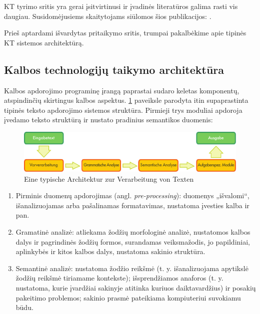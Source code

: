 \documentclass[]{../metanetpaper}
\begin{document}
\begin{multicols}{2}
KT tyrimo sritis yra gerai įsitvirtinusi ir įvadinės literatūros galima rasti vis daugiau. Susidomėjusiems skaitytojams siūlomos šios publikacijos:  \cite{carstensen-etal1, jurafsky-martin01, manning-schuetze1, lt-world1, lt-survey1}.

 Prieš aptardami išvardytas pritaikymo sritis, trumpai pakalbėkime apie tipinės KT sistemos architektūrą.  

\subsection{Kalbos technologijų taikymo architektūra}

Kalbos apdorojimo programinę įrangą paprastai sudaro keletas komponentų, atspindinčių skirtingus kalbos aspektus.  \ref{fig:textprocessingarch_de} paveiksle parodyta itin supaprastinta tipinės teksto apdorojimo sistemos struktūra. Pirmieji trys moduliai apdoroja įvedamo teksto struktūrą ir nustato pradinius semantikos duomenis:

\begin{figure}[htb]
  \center
  \includegraphics[width=\textwidth]{../_media/german/text_processing_app_architecture}
  \caption{Eine typische Architektur zur Verarbeitung von Texten}
  \label{fig:textprocessingarch_de}
\end{figure}

\begin{enumerate}
\item Pirminis duomenų apdorojimas (angl. \textit{pre-processing}):  duomenys „išvalomi“, išanalizuojamas arba pašalinamas formatavimas, nustatoma įvesties kalba ir pan.
\item Gramatinė analizė: atliekama žodžių morfologinė analizė, nustatomos kalbos dalys ir pagrindinės žodžių formos, surandamas veiksmažodis, jo papildiniai, aplinkybės ir kitos kalbos dalys, nustatoma sakinio struktūra.
\item Semantinė analizė: nustatoma žodžio reikšmė (t. y. išanalizuojama apytikslė žodžių reikšmė tiriamame kontekste); išsprendžiamos anaforos (t. y. nustatoma, kurie įvardžiai sakinyje atitinka kuriuos daiktavardžius) ir posakių pakeitimo problemos; sakinio prasmė pateikiama kompiuteriui suvokiamu būdu.
\end{enumerate}


\end{multicols}
\end{document}
